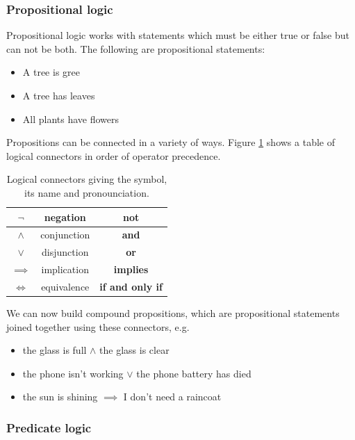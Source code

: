 \subsubsection{Propositional logic}

Propositional logic works with statements which must be either true or false but can not be both. The following are propositional statements:
\begin{itemize}
\item A tree is gree

\item A tree has leaves

\item All plants have flowers
\end{itemize}

Propositions can be connected in a variety of ways. Figure \ref{tab:logcon} shows a table of logical connectors in order of operator precedence.

\begin{table}[H]
\centering
\begin{tabular}{| c | c | c |}
\hline
$\neg$ & negation & \textbf{not} \\
\hline
$\land$ & conjunction & \textbf{and} \\
\hline
$\lor$ & disjunction & \textbf{or} \\
\hline
$\implies$ & implication & \textbf{implies} \\
\hline
$\Leftrightarrow$ & equivalence & \textbf{if and only if} \\
\hline
\end{tabular}
\caption{Logical connectors giving the symbol, its name and pronounciation. \label{tab:logcon}}
\end{table}

We can now build compound propositions, which are propositional statements joined together using these connectors, e.g.

\begin{itemize}
\item the glass is full $\land$ the glass is clear

\item the phone isn't working $\lor$ the phone battery has died

\item the sun is shining $\implies$ I don't need a raincoat
\end{itemize}

\subsubsection{Predicate logic}


